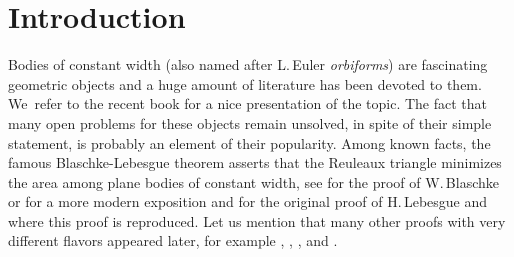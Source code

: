 \documentclass[JEP,XML,SOM,Unicode,NoFloatCountersInSection]{cedram}
\theoremstyle{plain}
\theoremstyle{definition}
\begin{document}
\maketitle
\vspace*{-.5\baselineskip}
\tableofcontents
\mainmatter

\vspace*{-2.5\baselineskip}
\mbox{}
\section{Introduction}

Bodies of constant width (also named after L.\,Euler \emph{orbiforms}) are fascinating geometric
objects and a huge amount of literature has been devoted to them. We~refer to the recent book
\cite{MMO} for a nice presentation of the topic. The fact that many open problems for these objects
remain unsolved, in spite of their simple statement, is probably an element of their popularity.
Among known facts, the famous Blaschke-Lebesgue theorem asserts that the Reuleaux triangle
minimizes the area among plane bodies of constant width, see \cite{Bla} for the proof of W.\,Blaschke or \cite{KM} for a more modern exposition and \cite{Le} for the original proof of H.\,Lebesgue
and \cite{BF} where this proof is reproduced. Let us mention that many
other proofs with very different flavors appeared later, for example \cite{Be}, \cite{CCG},
\cite{Eg}, \cite{Ga} and \cite{Ha}.
\end{document}
